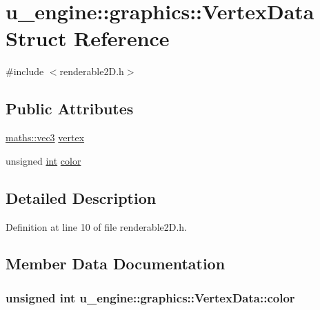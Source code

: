 \hypertarget{structu__engine_1_1graphics_1_1_vertex_data}{}\section{u\+\_\+engine\+:\+:graphics\+:\+:Vertex\+Data Struct Reference}
\label{structu__engine_1_1graphics_1_1_vertex_data}


{\ttfamily \#include $<$renderable2\+D.\+h$>$}

\subsection*{Public Attributes}
\begin{DoxyCompactItemize}
\item 
\hyperlink{structu__engine_1_1maths_1_1vec3}{maths\+::vec3} \hyperlink{structu__engine_1_1graphics_1_1_vertex_data_adf046d0ecf57011afb32f5ac737c2efd}{vertex}
\item 
unsigned \hyperlink{wglew_8h_a500a82aecba06f4550f6849b8099ca21}{int} \hyperlink{structu__engine_1_1graphics_1_1_vertex_data_a3cc6c952a7b302374d84c048981a773f}{color}
\end{DoxyCompactItemize}


\subsection{Detailed Description}


Definition at line 10 of file renderable2\+D.\+h.



\subsection{Member Data Documentation}
\hypertarget{structu__engine_1_1graphics_1_1_vertex_data_a3cc6c952a7b302374d84c048981a773f}{}
\subsubsection[{color}]{\setlength{\rightskip}{0pt plus 5cm}unsigned {\bf int} u\+\_\+engine\+::graphics\+::\+Vertex\+Data\+::color}\label{structu__engine_1_1graphics_1_1_vertex_data_a3cc6c952a7b302374d84c048981a773f}


